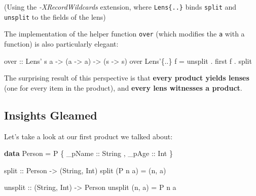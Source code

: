 \documentclass[]{article}
\newenvironment{Shaded}{}{}
\newcommand{\DataTypeTok}[1]{\textcolor[rgb]{0.56,0.13,0.00}{#1}}
\newcommand{\FunctionTok}[1]{\textcolor[rgb]{0.02,0.16,0.49}{#1}}
\newcommand{\KeywordTok}[1]{\textcolor[rgb]{0.00,0.44,0.13}{\textbf{#1}}}
\newcommand{\NormalTok}[1]{#1}
\newcommand{\OtherTok}[1]{\textcolor[rgb]{0.00,0.44,0.13}{#1}}
\begin{document}
(Using the \emph{-XRecordWildcards} extension, where
\texttt{Lens\textquotesingle{}\{..\}} binds \texttt{split} and \texttt{unsplit}
to the fields of the lens)

The implementation of the helper function \texttt{over} (which modifies the
\texttt{a} with a function) is also particularly elegant:

\begin{Shaded}
\begin{Highlighting}[]
\OtherTok{over ::} \DataTypeTok{Lens'}\NormalTok{ s a }\OtherTok{->}\NormalTok{ (a }\OtherTok{->}\NormalTok{ a) }\OtherTok{->}\NormalTok{ (s }\OtherTok{->}\NormalTok{ s)}
\NormalTok{over }\DataTypeTok{Lens'}\NormalTok{\{}\FunctionTok{..}\NormalTok{\} f }\FunctionTok{=}\NormalTok{ unsplit }\FunctionTok{.}\NormalTok{ first f }\FunctionTok{.}\NormalTok{ split}
\end{Highlighting}
\end{Shaded}

The surprising result of this perspective is that \textbf{every product yields
lenses} (one for every item in the product), and \textbf{every lens witnesses a
product}.

\hypertarget{insights-gleamed}{%
\subsection{Insights Gleamed}\label{insights-gleamed}}

Let's take a look at our first product we talked about:

\begin{Shaded}
\begin{Highlighting}[]
\KeywordTok{data} \DataTypeTok{Person} \FunctionTok{=} \DataTypeTok{P}\NormalTok{ \{}\OtherTok{ _pName ::} \DataTypeTok{String}
\NormalTok{                ,}\OtherTok{ _pAge  ::} \DataTypeTok{Int}
\NormalTok{                \}}

\OtherTok{split ::} \DataTypeTok{Person} \OtherTok{->}\NormalTok{ (}\DataTypeTok{String}\NormalTok{, }\DataTypeTok{Int}\NormalTok{)}
\NormalTok{split (}\DataTypeTok{P}\NormalTok{ n a) }\FunctionTok{=}\NormalTok{ (n, a)}

\OtherTok{unsplit ::}\NormalTok{ (}\DataTypeTok{String}\NormalTok{, }\DataTypeTok{Int}\NormalTok{) }\OtherTok{->} \DataTypeTok{Person}
\NormalTok{unsplit (n, a) }\FunctionTok{=} \DataTypeTok{P}\NormalTok{ n a}
\end{Highlighting}
\end{Shaded}
\end{document}
